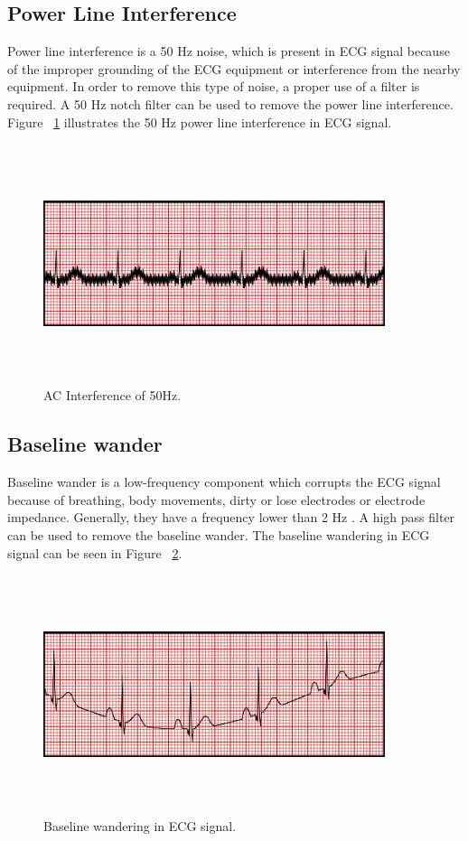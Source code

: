 \subsection{Power Line Interference}
Power line interference is a 50 Hz noise, which is present in ECG signal because of the improper grounding of the ECG equipment or interference from the nearby equipment. In order to remove this type of noise, a proper use of a filter is required. A 50 Hz notch filter can be used to remove the power line interference. Figure ~\ref{fig:ACInterference} illustrates the 50 Hz power line interference in ECG signal.

\begin{figure}[htpb]
	\centering
	\includegraphics[width=10cm,height=7cm,keepaspectratio=true]{images/ACInterference}
	\caption{
		AC Interference of 50Hz\cite{ecg_artifacts}.
	}
	\label{fig:ACInterference}
\end{figure}

\subsection{Baseline wander}
Baseline wander is a low-frequency component which corrupts the ECG signal because of breathing, body movements, dirty or lose electrodes or electrode impedance. Generally, they have a frequency lower than 2 Hz \cite{schilling2012analysis}. A high pass filter can be used to remove the baseline wander. The baseline wandering in ECG signal can be seen in Figure ~\ref{fig:WBaseline}.

\begin{figure}[htpb]
	\centering
	\includegraphics[width=10cm,height=7cm,keepaspectratio=true]{images/WBaseline}
	\caption{
		Baseline wandering in ECG signal\cite{ecg_artifacts}.
	}
	\label{fig:WBaseline}
\end{figure}

